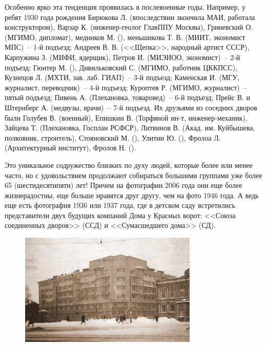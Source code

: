 \begin{figure}
\end{figure}

\restoregeometry

Особенно ярко эта тенденция проявилась в послевоенные годы. Например, у ребят 1930 года рождения Бирюкова Л. (впоследствии зкончила МАИ, работала конструктором), Варзар К. (инженер-геолог ГлавППУ Москвы), Гриневский О. (МГИМО, дипломат), медников М. (), меньшикова Т. В. (МИИТ, экономист МПС)~-- 1-й подъезд; Андреев В. В. (<<Щепка>>, народный артист СССР), Карпужина З. (МИФИ, ядерщик), Петров И. (МИЭИОО, экономист)~-- 2-й подъезд; Гюнтер М. (), Дивильковский С. (МГИМО, работник ЦККПСС), Кузнецов Л. (МХТИ, зав. лаб. ГИАП)~-- 3-й подъезд; Каменская И. (МГУ, журналист, переводчик)~-- 4-й подъезд; Куроптев Р. (МГИМО, журналист)~-- пятый подъезд; Пивень А. (Плехановка, товаровед)~-- 6-й подъезд; Прейс В. и Штернберг А. (медвузы, врачи)~-- 7-й подъезд. Их друзьями из соседних дворов были Голубев В. (военный), Епишкин В. (Торфяной ин-т, инженер-механик), Зайцева Т. (Плехановка, Госплан РСФСР), Литвинов В. (Акад. им. Куйбышева, полковник, строитель), Стояновский М. (), Улитин Ю. (), Фролоа Л. (Архитектурный институт), Фролов Н. ().

Это уникальное содружество близких по духу людей, которые более или менее часто, но с удовольствием продолжают собираться большими группами уже более 65 (шестидесятипяти) лет! Причем на фотографии 2006 года они еще более жизнерадостны, еще больше нравятся друг другу, чем на фото 1946 года. А ведь еще есть фотография 1936 или 1937 года, где в детском саду встретились представители двух будущих компаний Дома у Красных ворот: <<Союза соединенных дворов>> (ССД) и <<Сумасшедшего дома>> (СД).

\newpage


\thispagestyle{empty} 
\begin{figure}
    \includegraphics[width=85mm]{inc/2/1}
\end{figure}

